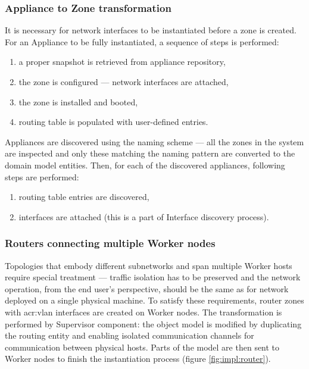 \documentclass[11pt,openany]{book}
\begin{document}
        \subsubsection{Appliance to Zone transformation}

          It is necessary for network interfaces to be instantiated before a zone is created. For an Appliance to be
          fully instantiated, a sequence of steps is performed:

          \begin{enumerate}
            \item a proper snapshot is retrieved from appliance repository,
            \item the zone is configured --- network interfaces are attached,
            \item the zone is installed and booted,
            \item routing table is populated with user-defined entries.
          \end{enumerate}

          Appliances are discovered using the naming scheme --- all the zones in the system are inspected and only these
          matching the naming pattern are converted to the domain model entities. Then, for each of the discovered
          appliances, following steps are performed:

          \begin{enumerate}
            \item routing table entries are discovered,
            \item interfaces are attached (this is a part of Interface discovery process).
          \end{enumerate}


        \subsubsection{Routers connecting multiple Worker nodes}

          Topologies that embody different subnetworks and span multiple Worker hosts require special treatment ---
          traffic isolation has to be preserved and the network operation, from the end user's perspective, should be
          the same as for network deployed on a single physical machine. To satisfy these requirements, router zones
          with \gls{acr:vlan} interfaces are created on Worker nodes. The transformation is performed by Supervisor
          component: the object model is modified by duplicating the routing entity and enabling isolated communication
          channels for communication between physical hosts. Parts of the model are then sent to Worker nodes to finish
          the instantiation process (figure \ref{fig:impl:router}).
\end{document}
